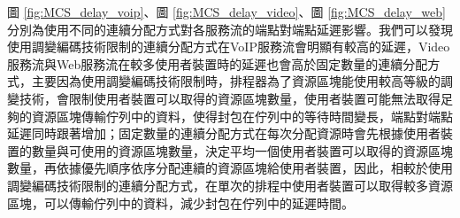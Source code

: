 圖 \ref{fig:MCS_delay_voip}、圖 \ref{fig:MCS_delay_video}、圖 \ref{fig:MCS_delay_web}分別為使用不同的連續分配方式對各服務流的端點對端點延遲影響。我們可以發現使用調變編碼技術限制的連續分配方式在VoIP服務流會明顯有較高的延遲，Video服務流與Web服務流在較多使用者裝置時的延遲也會高於固定數量的連續分配方式，主要因為使用調變編碼技術限制時，排程器為了資源區塊能使用較高等級的調變技術，會限制使用者裝置可以取得的資源區塊數量，使用者裝置可能無法取得足夠的資源區塊傳輸佇列中的資料，使得封包在佇列中的等待時間變長，端點對端點延遲同時跟著增加；固定數量的連續分配方式在每次分配資源時會先根據使用者裝置的數量與可使用的資源區塊數量，決定平均一個使用者裝置可以取得的資源區塊數量，再依據優先順序依序分配連續的資源區塊給使用者裝置，因此，相較於使用調變編碼技術限制的連續分配方式，在單次的排程中使用者裝置可以取得較多資源區塊，可以傳輸佇列中的資料，減少封包在佇列中的延遲時間。

